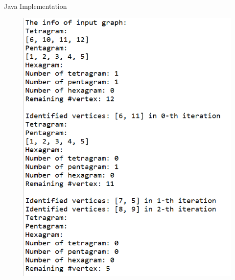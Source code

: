\documentclass{beamer}
\begin{document}
\begin{frame}{Java Implementation}
\begin{figure}[htbp]
\centering
\begin{minipage}[t]{0.48\textwidth}
\centering
\includegraphics[width=1\textwidth]{figure/program identify.png}
\end{minipage}
\begin{minipage}[t]{0.48\textwidth}
\centering

\end{minipage}
\end{figure}
\end{frame}
\end{document}

